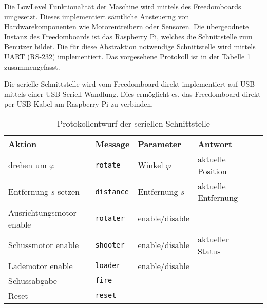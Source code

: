 Die LowLevel Funktionalität der Maschine wird mittels des Freedomboards
umgesetzt. Dieses implementiert sämtliche Ansteuerng von Hardwarekomponenten
wie Motorentreibern oder Sensoren. Die übergeodnete Instanz des Freedomboards
ist das Raspberry Pi, welches die Schnittstelle zum Benutzer bildet. Die für
diese Abstraktion notwendige Schnittstelle wird mittels UART (RS-232)
implementiert. Das vorgesehene Protokoll ist in der Tabelle \ref{tab:uart}
zusammengefasst.

Die serielle Schnittstelle wird vom Freedomboard direkt implementiert auf
USB mittels einer USB-Seriell Wandlung. Dies ermöglicht es, das Freedomboard
direkt per USB-Kabel am Raspberry Pi zu verbinden.

\begin{table}[h!]
	\centering
	\begin{tabular}{l l l l l}
		Aktion & Message & Parameter & Antwort \\
		\hline
		drehen um $\varphi$ 
			& \verb!rotate!
			& Winkel $\varphi$
			& aktuelle Position \\
		Entfernung $s$ setzen
			& \verb!distance!
			& Entfernung $s$
			& aktuelle Entfernung \\
		Ausrichtungsmotor enable
			& \verb!rotater!
			& enable/disable
			& \\
		Schussmotor enable
			& \verb!shooter! 
			& enable/disable
			& aktueller Status \\
		Lademotor enable
			& \verb!loader!
			& enable/disable
			& \\
		Schussabgabe
			& \verb!fire!
			& -
			& \\
		Reset
			& \verb!reset!
			& -
			& \\
	\end{tabular}
	\caption{Protokollentwurf der seriellen Schnittstelle}
	\label{tab:uart}
\end{table}

